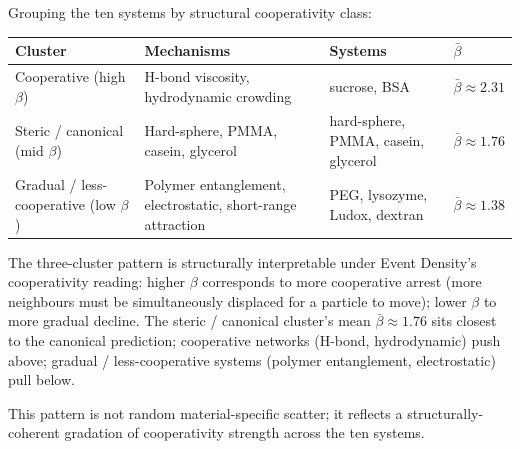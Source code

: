 \documentclass[
  11pt,a4paper]{article}
\newcounter{none} %
\begin{document}
Grouping the ten systems by structural cooperativity class:

{\def\LTcaptype{none} %
\begin{longtable}[]{@{}
  >{\raggedright\arraybackslash}p{}
  >{\raggedright\arraybackslash}p{}
  >{\raggedright\arraybackslash}p{}
  >{\raggedright\arraybackslash}p{}@{}}
\toprule\noalign{}
\begin{minipage}[b]{\linewidth}\raggedright
Cluster
\end{minipage} & \begin{minipage}[b]{\linewidth}\raggedright
Mechanisms
\end{minipage} & \begin{minipage}[b]{\linewidth}\raggedright
Systems
\end{minipage} & \begin{minipage}[b]{\linewidth}\raggedright
\(\bar\beta\)
\end{minipage} \\
\midrule\noalign{}
\endhead
\bottomrule\noalign{}
\endlastfoot
Cooperative (high \(\beta\)) & H-bond viscosity, hydrodynamic crowding &
sucrose, BSA & \(\bar\beta \approx 2.31\) \\
Steric / canonical (mid \(\beta\)) & Hard-sphere, PMMA, casein, glycerol
& hard-sphere, PMMA, casein, glycerol & \(\bar\beta \approx 1.76\) \\
Gradual / less-cooperative (low \(\beta\)) & Polymer entanglement,
electrostatic, short-range attraction & PEG, lysozyme, Ludox, dextran &
\(\bar\beta \approx 1.38\) \\
\end{longtable}
}

The three-cluster pattern is structurally interpretable under Event
Density's cooperativity reading: higher \(\beta\) corresponds to more
cooperative arrest (more neighbours must be simultaneously displaced for
a particle to move); lower \(\beta\) to more gradual decline. The steric
/ canonical cluster's mean \(\bar\beta \approx 1.76\) sits closest to
the canonical prediction; cooperative networks (H-bond, hydrodynamic)
push above; gradual / less-cooperative systems (polymer entanglement,
electrostatic) pull below.

This pattern is not random material-specific scatter; it reflects a
structurally-coherent gradation of cooperativity strength across the ten
systems.
\end{document}

